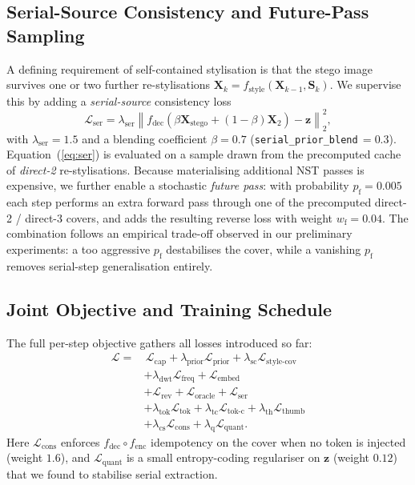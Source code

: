 \documentclass[conference]{IEEEtran}
\begin{document}
\subsection{Serial-Source Consistency and Future-Pass Sampling}
\label{sec:serial}
A defining requirement of self-contained stylisation is that the stego image survives one or two further re-stylisations $\mathbf{X}_{k}\!=\!f_{\text{style}}(\mathbf{X}_{k-1},\mathbf{S}_{k})$. We supervise this by adding a \emph{serial-source} consistency loss
\begin{equation}
    \mathcal{L}_{\text{ser}} = \lambda_{\text{ser}}\!\left\|f_{\text{dec}}\!\left(\beta\mathbf{X}_{\text{stego}}+(1-\beta)\mathbf{X}_{2}\right)-\mathbf{z}\right\|_2^{2},
    \label{eq:ser}
\end{equation}
with $\lambda_{\text{ser}}\!=\!1.5$ and a blending coefficient $\beta\!=\!0.7$ (\texttt{serial\_prior\_blend}\,$=0.3$). Equation~(\ref{eq:ser}) is evaluated on a sample drawn from the precomputed cache of \emph{direct-2} re-stylisations. Because materialising additional NST passes is expensive, we further enable a stochastic \emph{future pass}: with probability $p_{\text{f}}\!=\!0.005$ each step performs an extra forward pass through one of the precomputed direct-2 / direct-3 covers, and adds the resulting reverse loss with weight $w_{\text{f}}\!=\!0.04$. The combination follows an empirical trade-off observed in our preliminary experiments: a too aggressive $p_{\text{f}}$ destabilises the cover, while a vanishing $p_{\text{f}}$ removes serial-step generalisation entirely.

\subsection{Joint Objective and Training Schedule}
\label{sec:total}
The full per-step objective gathers all losses introduced so far:
\begin{equation}
\begin{aligned}
\mathcal{L} =&\, \mathcal{L}_{\text{cap}} + \lambda_{\text{prior}}\mathcal{L}_{\text{prior}} + \lambda_{\text{sc}}\mathcal{L}_{\text{style-cov}} \\
& + \lambda_{\text{dwt}}\mathcal{L}_{\text{freq}} + \mathcal{L}_{\text{embed}} \\
& + \mathcal{L}_{\text{rev}} + \mathcal{L}_{\text{oracle}} + \mathcal{L}_{\text{ser}} \\
& + \lambda_{\text{tok}}\mathcal{L}_{\text{tok}} + \lambda_{\text{tc}}\mathcal{L}_{\text{tok-c}} + \lambda_{\text{th}}\mathcal{L}_{\text{thumb}} \\
& + \lambda_{\text{cs}}\mathcal{L}_{\text{cons}} + \lambda_{\text{q}}\mathcal{L}_{\text{quant}}.
\end{aligned}
\label{eq:total}
\end{equation}
Here $\mathcal{L}_{\text{cons}}$ enforces $f_{\text{dec}}\!\circ\!f_{\text{enc}}$ idempotency on the cover when no token is injected (weight $1.6$), and $\mathcal{L}_{\text{quant}}$ is a small entropy-coding regulariser on $\mathbf{z}$ (weight $0.12$) that we found to stabilise serial extraction.
\end{document}
